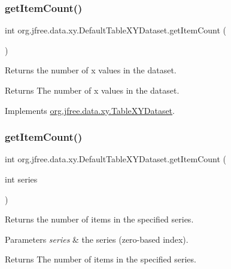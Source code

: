 \subsubsection{\texorpdfstring{get\+Item\+Count()}{getItemCount()}\hspace{0.1cm}{\footnotesize\ttfamily [1/2]}}
{\footnotesize\ttfamily int org.\+jfree.\+data.\+xy.\+Default\+Table\+X\+Y\+Dataset.\+get\+Item\+Count (\begin{DoxyParamCaption}{ }\end{DoxyParamCaption})}

Returns the number of x values in the dataset.

\begin{DoxyReturn}{Returns}
The number of x values in the dataset. 
\end{DoxyReturn}


Implements \mbox{\hyperlink{interfaceorg_1_1jfree_1_1data_1_1xy_1_1_table_x_y_dataset_ad9cd378be982c1d61cfb93a16370b6f0}{org.\+jfree.\+data.\+xy.\+Table\+X\+Y\+Dataset}}.

\mbox{\label{classorg_1_1jfree_1_1data_1_1xy_1_1_default_table_x_y_dataset_a04eb2509a27d4e1707a64ea260710849}} 
\subsubsection{\texorpdfstring{get\+Item\+Count()}{getItemCount()}\hspace{0.1cm}{\footnotesize\ttfamily [2/2]}}
{\footnotesize\ttfamily int org.\+jfree.\+data.\+xy.\+Default\+Table\+X\+Y\+Dataset.\+get\+Item\+Count (\begin{DoxyParamCaption}\item[{int}]{series }\end{DoxyParamCaption})}

Returns the number of items in the specified series.


\begin{DoxyParams}{Parameters}
{\em series} & the series (zero-\/based index).\\
\hline
\end{DoxyParams}
\begin{DoxyReturn}{Returns}
The number of items in the specified series. 
\end{DoxyReturn}


